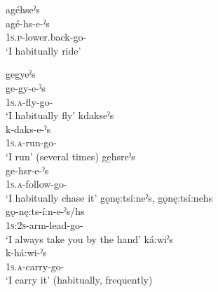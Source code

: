 \ea\label{ex:complmotex3}
\ea agéhseˀs\\
\gll agé-hs-e-ˀs\\
 \textsc{1s.p}-lower.back-go-{\habitual}\\
\glt `I habitually ride'

\ex gegyeˀs\\
\gll ge-gy-e-ˀs\\
 \textsc{1s.a}-fly-go-{\habitual}\\
\glt `I habitually fly'
\ex kdakseˀs \\
\gll k-daks-e-ˀs\\
 \textsc{1s.a}-run-go-{\habitual}\\
 \glt ‘I run’ (several times)
\ex ge̱hsreˀs\\
\gll ge-hsr-e-ˀs\\
 \textsc{1s.a}-follow-go-{\habitual}\\
\glt `I habitually chase it'
\ex gǫnę:tsí:neˀs, gǫnę:tsí:nehs\\
\gll gǫ-nę:ts-í:n-e-ˀs/hs\\
 \textsc{1s:2s}-arm-lead-go-{\habitual}\\
\glt `I always take you by the hand'
\ex ká:wiˀs \\
\gll k-há:wi-ˀs\\ 
 \textsc{1s.a}-carry-go-{\habitual}\\
 \glt ‘I carry it’ (habitually, frequently)
\z
\z


